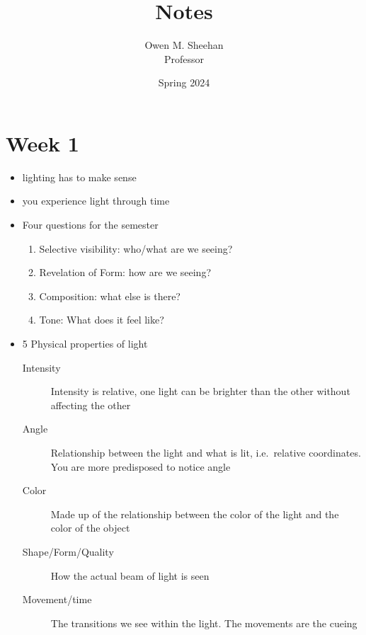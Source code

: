 \documentclass[12pt]{article}
\title{\class{} Notes}
\author{Owen M. Sheehan\\Professor \prof{}}
\date{Spring 2024}
\begin{document}
\maketitle
\tableofcontents
\newpage

    \section{Week 1}
        \bigskip
            \begin{itemize}
                \item lighting has to make sense
                \item you experience light through time
            \end{itemize}
        \smallskip
            \begin{itemize}
                \item Four questions for the semester
                \begin{enumerate}
                    \item Selective visibility: who/what are we seeing?
                    \item Revelation of Form: how are we seeing?
                    \item Composition: what else is there?
                    \item Tone: What does it feel like?
                \end{enumerate}
            \end{itemize}
        \smallskip
            \begin{itemize}
                \item 5 Physical properties of light
                \begin{description}
                    \item[Intensity] Intensity is relative, one light can be brighter than the other without affecting the other
                    \item[Angle] Relationship between the light and what is lit, i.e.\ relative coordinates. You are more predisposed to notice angle
                    \item[Color] Made up of the relationship between the color of the light and the color of the object
                    \item[Shape/Form/Quality] How the actual beam of light is seen
                    \item[Movement/time] The transitions we see within the light. The movements are the cueing
                \end{description}
            \end{itemize}
\end{document}

